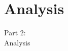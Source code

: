 \section{Analysis}
\begin{frame}
  \vspace{25mm}
  \begin{center}
    \Huge{Part 2:\\Analysis}
  \end{center}
\end{frame}
